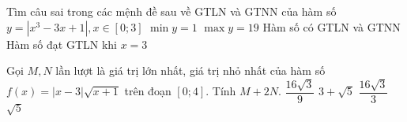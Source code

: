 \begin{ex}%
	Tìm câu sai trong các mệnh đề sau về GTLN và GTNN của hàm số $y=\left|x^3-3x+1\right|, x\in[0;3]$ 
	\choice
	{\True $\min y=1$}
	{$\max y=19$}
	{Hàm số có GTLN và GTNN}
	{Hàm số đạt GTLN khi $x=3$}
\end{ex}
\begin{ex}%
	Gọi $M,N$ lần lượt là giá trị lớn nhất, giá trị nhỏ nhất của hàm số $f(x)=|x-3|\sqrt{x+1}$ trên đoạn $[0;4]$. Tính $M+2N$. 
	\choice
	{\True $\dfrac{16\sqrt{3}}{9}$}
	{$3+\sqrt{5}$}
	{$\dfrac{16\sqrt{3}}{3}$}
	{$\sqrt{5}$}
\end{ex}
